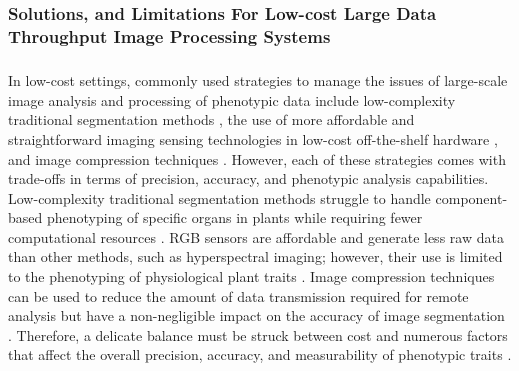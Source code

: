 \subsubsection{Solutions, and Limitations For Low-cost Large Data Throughput Image Processing Systems}
\subparagraph{}
In low-cost settings, commonly used strategies to manage the issues of large-scale image analysis and processing of phenotypic data include low-complexity traditional segmentation methods \cite{minerviniImageAnalysisNew2015}, the use of more affordable and straightforward imaging sensing technologies in low-cost off-the-shelf hardware \cite{tovarRaspberryPiPowered2018a}, and image compression techniques \cite{minerviniApplicationawareImageCompression2013}. However, each of these strategies comes with trade-offs in terms of precision, accuracy, and phenotypic analysis capabilities. Low-complexity traditional segmentation methods struggle to handle component-based phenotyping of specific organs in plants while requiring fewer computational resources \cite{choudhurySegmentationTechniquesChallenges2020}. RGB sensors are affordable and generate less raw data than other methods, such as hyperspectral imaging; however, their use is limited to the phenotyping of physiological plant traits \cite{liReviewImagingTechniques2014}. Image compression techniques can be used to reduce the amount of data transmission required for remote analysis but have a non-negligible impact on the accuracy of image segmentation \cite{minerviniApplicationawareImageCompression2013}. Therefore, a delicate balance must be struck between cost and numerous factors that affect the overall precision, accuracy, and measurability of phenotypic traits \cite{muller-linowPlantScreenMobile2019}.

